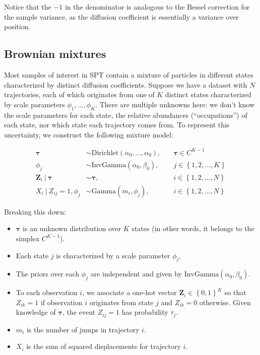 \documentclass{article}
\let\vec\boldsymbol
\begin{document}
Notice that the $-1$ in the denominator is analogous to the Bessel
correction for the sample variance, as the diffusion coefficient is essentially a variance over position.

\subsection{Brownian mixtures}

Most samples of interest in SPT contain a mixture of particles in different
states characterized by distinct diffusion coefficients. Suppose we have a dataset
with $N$ trajectories, each of which originates from one of $K$ distinct states
characterized by scale parameters $\phi_{1}, ..., \phi_{K}$. There are multiple
unknowns here: we don't know the scale parameters for each state, the relative
abundances (``occupations'') of each state, nor which state each trajectory comes
from. To represent this uncertainty, we construct the following mixture model:

\begin{align}\label{eq:brownian_mixture}
    \boldsymbol{\tau} &\sim \text{Dirichlet} \left( \alpha_{0}, ..., \alpha_{0} \right), &\quad \boldsymbol{\tau} \in C^{K-1} \\
    \phi_{j} &\sim \text{InvGamma} \left( \alpha_{0}, \beta_{0} \right), &\quad j \in \left\{ 1, 2, ..., K \right\} \\
    \vec{Z}_{i} \ | \ \boldsymbol{\tau} &\sim \boldsymbol{\tau}, &\quad i \in \left\{ 1, 2, ..., N \right\} \\
    X_{i} \ | \ Z_{ij} = 1, \phi_{j} &\sim \text{Gamma} \left( m_{i}, \phi_{j} \right), &\quad i \in \left\{ 1, 2, ..., N \right\} \label{eq:brownian_mixture_last}
\end{align}

Breaking this down:
\begin{itemize}
    \item $\boldsymbol{\tau}$ is an unknown distribution over $K$ states (in other words, it belongs to the simplex $C^{K-1}$).
    \item Each state $j$ is characterized by a scale parameter $\phi_{j}$.
    \item The priors over each $\phi_{j}$ are independent and given by $\text{InvGamma} (\alpha_{0}, \beta_{0})$.
    \item To each observation $i$, we associate a one-hot vector $\vec{Z}_{i} \in \left\{ 0, 1 \right\}^{K}$ so that $Z_{ik} = 1$ if observation $i$ originates from state $j$ and $Z_{ik} = 0$ otherwise. Given knowledge of $\boldsymbol{\tau}$, the event $Z_{ij} = 1$ has probability $\tau_{j}$.
    \item $m_{i}$ is the number of jumps in trajectory $i$.
    \item $X_{i}$ is the sum of squared displacements for trajectory $i$.
\end{itemize}
\end{document}
